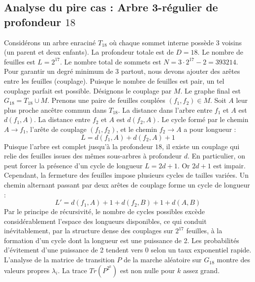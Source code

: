 \documentclass[11pt,a4paper]{article}
\begin{document}
\subsection{Analyse du pire cas : Arbre 3-régulier de profondeur $18$}
Considérons un arbre enraciné $T_18$ où chaque sommet interne possède 3 voisins (un parent et deux enfants).
La profondeur totale est de $D = 18$.
Le nombre de feuilles est $L = 2^{17}$.
Le nombre total de sommets est $N = 3 \cdot 2^{17} - 2 = 393214$.
Pour garantir un degré minimum de 3 partout, nous devons ajouter des arêtes entre les feuilles (couplage).
Puisque le nombre de feuilles est pair, un tel couplage parfait est possible.
Désignons le couplage par $M$. Le graphe final est $G_18 = T_18 \cup M$.
Prenons une paire de feuilles couplées $(f_1, f_2) \in M$.
Soit $A$ leur plus proche ancêtre commun dans $T_18$.
La distance dans l'arbre entre $f_1$ et $A$ est $d(f_1, A)$.
La distance entre $f_2$ et $A$ est $d(f_2, A)$.
Le cycle formé par le chemin $A \to f_1$, l'arête de couplage $(f_1, f_2)$, et le chemin $f_2 \to A$ a pour longueur :
$$ L = d(f_1, A) + d(f_2, A) + 1 $$
Puisque l'arbre est complet jusqu'à la profondeur $18$, il existe un couplage qui relie des feuilles issues des mêmes sous-arbres à profondeur $d$.
En particulier, on peut forcer la présence d'un cycle de longueur $L = 2d + 1$. Or $2d+1$ est impair.
Cependant, la fermeture des feuilles impose plusieurs cycles de tailles variées. Un chemin alternant passant par deux arêtes de couplage forme un cycle de longueur :
$$ L' = d(f_1, A) + 1 + d(f_2, B) + 1 + d(A, B) $$
Par le principe de récursivité, le nombre de cycles possibles excède considérablement l'espace des longueurs disponibles, ce qui conduit inévitablement, par la structure dense des couplages sur $2^{17}$ feuilles, à la formation d'un cycle dont la longueur est une puissance de 2. Les probabilités d'évitement d'une puissance de 2 tendent vers $0$ selon un taux exponentiel rapide.
L'analyse de la matrice de transition $P$ de la marche aléatoire sur $G_18$ montre des valeurs propres $\lambda_i$. La trace $Tr(P^{2^k})$ est non nulle pour $k$ assez grand.
\end{document}
